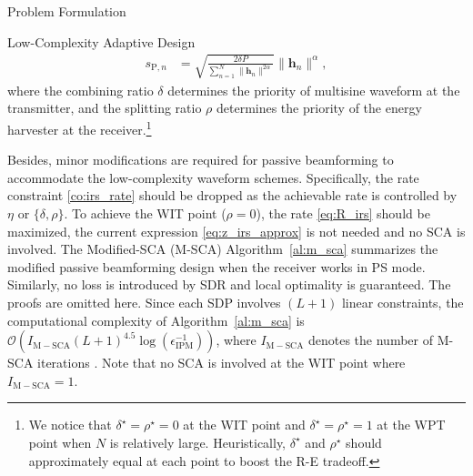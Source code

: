 \documentclass[journal]{IEEEtran}
\begin{document}
\begin{section}{Problem Formulation}
\begin{subsection}{Low-Complexity Adaptive Design}
\begin{align}
				s_{\mathrm{P}, n} &= \sqrt{\frac{2 \delta P}{\sum_{n=1}^N \lVert{\boldsymbol{h}_n \rVert^{2 \alpha}}}}\lVert{\boldsymbol{h}_n}\rVert^\alpha, \label{eq:s_p}
			\end{align}
			where the combining ratio $\delta$ determines the priority of multisine waveform at the transmitter, and the splitting ratio $\rho$ determines the priority of the energy harvester at the receiver.\footnote{We notice that $\delta^{\star}=\rho^{\star}=0$ at the WIT point and $\delta^{\star}=\rho^{\star}=1$ at the WPT point when $N$ is relatively large. Heuristically, $\delta^{\star}$ and $\rho^{\star}$ should approximately equal at each point to boost the R-E tradeoff.}

			Besides, minor modifications are required for passive beamforming to accommodate the low-complexity waveform schemes. Specifically, the rate constraint \eqref{co:irs_rate} should be dropped as the achievable rate is controlled by $\eta$ or $\{\delta,\rho\}$. To achieve the WIT point ($\rho=0$), the rate \eqref{eq:R_irs} should be maximized, the current expression \eqref{eq:z_irs_approx} is not needed and no SCA is involved. The Modified-SCA (M-SCA) Algorithm~\ref{al:m_sca} summarizes the modified passive beamforming design when the receiver works in PS mode. Similarly, no loss is introduced by SDR and local optimality is guaranteed. The proofs are omitted here. Since each SDP involves $(L+1)$ linear constraints, the computational complexity of Algorithm~\ref{al:m_sca} is $\mathcal{O}\left(I_{\mathrm{M-SCA}}(L+1)^{4.5} \log(\epsilon_{\mathrm{IPM}}^{-1})\right)$, where $I_{\mathrm{M-SCA}}$ denotes the number of M-SCA iterations \cite{Luo2010}. Note that no SCA is involved at the WIT point where $I_{\mathrm{M-SCA}}=1$.


\end{subsection}
\end{section}
\end{document}
